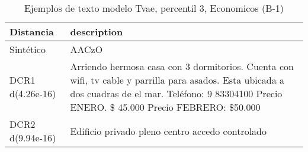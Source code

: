 \begin{table}[H]
\centering
\fontsize{10}{14}\selectfont
\caption{Ejemplos de texto modelo Tvae, percentil 3, Economicos (B-1)}
\label{table-example-economicos-b-1-tvae-3p-text}
\begin{tabular}{|l|m{35em}|}
\hline
\rowcolor[gray]{0.8}
Distancia & description \\
\hline Sintético & AACzO \\
\hline DCR1 d(4.26e-16) & Arriendo hermosa casa con 3 dormitorios. Cuenta con wifi, tv cable y parrilla para asados. Esta ubicada a dos cuadras de el mar. Tel\'efono: 9 83304100
Precio ENERO. \$ 45.000
Precio FEBRERO: \$50.000
 \\
\hline DCR2 d(9.94e-16) & Edificio privado pleno centro accedo controlado \\
\hline
\end{tabular}
\end{table}
